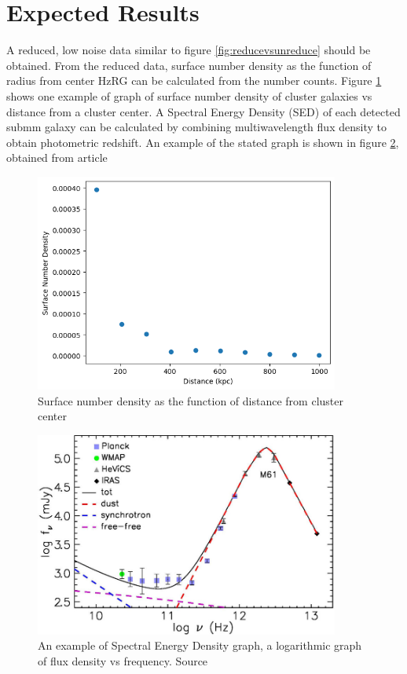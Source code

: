 \documentclass{article}
\begin{document}
\section{Expected Results}
A reduced, low noise data similar to figure \ref{fig:reducevsunreduce} should be obtained. From the reduced data, surface number density as the function of radius from center HzRG can be calculated from the number counts. Figure \ref{fig:sndensity} shows one example of graph of surface number density of cluster galaxies vs distance from a cluster center. A Spectral Energy Density (SED) of each detected submm galaxy can be calculated by combining multiwavelength flux density to obtain photometric redshift. An example of the stated graph is shown in figure \ref{fig:sedgraph}, obtained from article \parencite{Zotti2018}

\begin{figure}
    \centering
    \includegraphics[width=100mm]{SNDensity.png}
    \caption{Surface number density as the function of distance from cluster center}
    \label{fig:sndensity}
\end{figure}

\begin{figure}
    \centering
    \includegraphics[width=100mm]{SED.png}
    \caption{An example of Spectral Energy Density graph, a logarithmic graph of flux density vs frequency. Source \parencite{Zotti2018}}
    \label{fig:sedgraph}
\end{figure}
\end{document}
